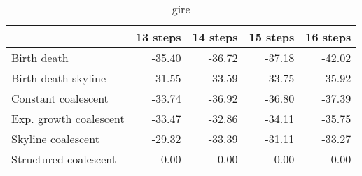 \begin{table}[ht]
\centering
\begin{tabular}{lrrrr}
  \hline
 & 13 steps & 14 steps & 15 steps & 16 steps \\ 
  \hline
Birth death & -35.40 & -36.72 & -37.18 & -42.02 \\ 
  Birth death skyline & -31.55 & -33.59 & -33.75 & -35.92 \\ 
  Constant coalescent & -33.74 & -36.92 & -36.80 & -37.39 \\ 
  Exp. growth coalescent & -33.47 & -32.86 & -34.11 & -35.75 \\ 
  Skyline coalescent & -29.32 & -33.39 & -31.11 & -33.27 \\ 
  Structured coalescent & 0.00 & 0.00 & 0.00 & 0.00 \\ 
   \hline
\end{tabular}
\caption{gire} 
\label{table:gire_likelihoods}
\end{table}
